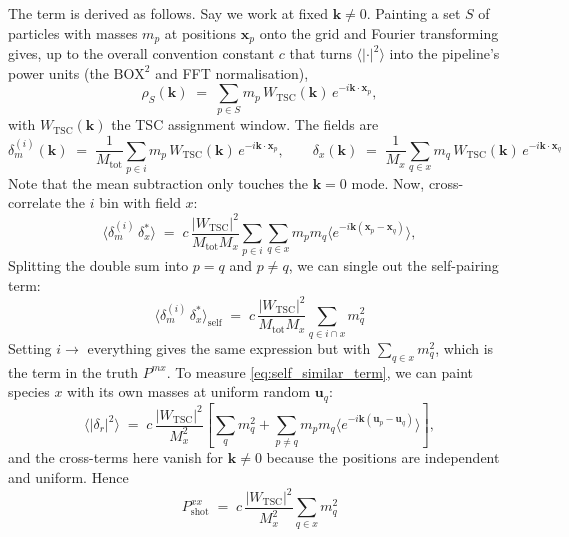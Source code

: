 \documentclass{article}
\begin{document}
The term is derived as follows. Say we work at fixed $\mathbf{k} \neq 0$. Painting a set $S$ of particles with masses $m_p$ at positions 
$\mathbf{x}_p$ onto the grid and Fourier transforming gives, up to the overall convention constant $c$ that turns $\langle |\cdot|^2\rangle$ into the pipeline's power units (the $\mathrm{BOX}^2$ and FFT normalisation),
\begin{equation}
    \rho_S(\mathbf{k}) \;=\; \sum_{p \in S} m_p \, W_\mathrm{TSC}(\mathbf{k}) \, e^{-i \mathbf{k} \cdot \mathbf{x}_p}, 
\end{equation}
with $W_\mathrm{TSC}(\mathbf{k})$ the TSC assignment window. The fields are
\begin{equation} \label{eq:ft_fields_def}
    \delta_m^{(i)} (\mathbf{k}) \;=\; \frac{1}{M_\mathrm{tot}} \sum_{p \in i} m_p \, W_\mathrm{TSC}(\mathbf{k}) \, e^{-i \mathbf{k} \cdot \mathbf{x}_p}, \qquad \delta_x(\mathbf{k}) \;=\; \frac{1}{M_x} \sum_{q \in x} m_q \, W_\mathrm{TSC}(\mathbf{k}) \, e^{-i \mathbf{k} \cdot \mathbf{x}_q}
\end{equation}
Note that the mean subtraction only touches the $\mathbf{k}=0$ mode. Now, cross-correlate the $i$ bin with field $x$:
\begin{equation}
    \langle \delta_m^{(i)} \, \delta_x^* \rangle \;=\; c \,\frac{|W_\mathrm{TSC}|^2}{M_\mathrm{tot}M_x} \sum_{p \in i}\sum_{q \in x} m_pm_q\langle e^{-i \mathbf{k}(\mathbf{x}_p - \mathbf{x}_q)} \rangle,
\end{equation}
Splitting the double sum into $p=q$ and $p \neq q$, we can single out the self-pairing term:
\begin{equation} \label{eq:self_similar_term}
    \langle \delta_m^{(i)} \, \delta_x^* \rangle_\mathrm{self} \;=\; c \, \frac{|W_\mathrm{TSC}|^2}{M_\mathrm{tot}M_x} \sum_{q \in i \cap x} m_q^2
\end{equation}
Setting $i \rightarrow$ everything gives the same expression but with $\sum_{q \in x} m_q^2$, which is the term in the truth $P^{mx}$. To measure \eqref{eq:self_similar_term}, we can paint species $x$ with its own masses at uniform random $\mathbf{u}_q$:
\begin{equation}
    \langle|\delta_r|^2\rangle \;=\; c\,\frac{|W_\mathrm{TSC}|^2}{M_x^2} \left[ \sum_q m_q^2 + \sum_{p \neq q} m_p m_q \langle e^{-i \mathbf{k}(\mathbf{u}_p - \mathbf{u}_q)} \rangle\right],
\end{equation}
and the cross-terms here vanish for $\mathbf{k} \neq 0$ because the positions are independent and uniform. Hence
\begin{equation} \label{eq:P_shot_def}
    P^{xx}_\mathrm{shot} \;=\; c \, \frac{|W_\mathrm{TSC}|^2}{M_x^2} \sum_{q \in x} m_q^2
\end{equation}
\end{document}
